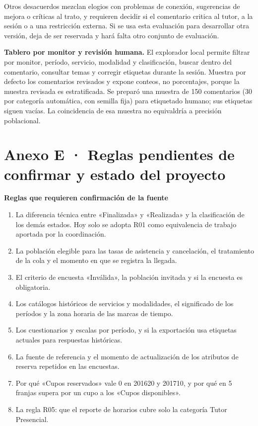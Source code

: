 \documentclass[11pt,letterpaper]{article}
\begin{document}
Otros desacuerdos mezclan elogios con problemas de conexión, sugerencias de mejora o críticas al trato, y requieren decidir si el comentario critica al tutor, a la sesión o a una restricción externa. Si se usa esta evaluación para desarrollar otra versión, deja de ser reservada y hará falta otro conjunto de evaluación.

\textbf{Tablero por monitor y revisión humana.} El explorador local permite filtrar por monitor, período, servicio, modalidad y clasificación, buscar dentro del comentario, consultar temas y corregir etiquetas durante la sesión. Muestra por defecto los comentarios revisados y expone conteos, no porcentajes, porque la muestra revisada es estratificada. Se preparó una muestra de 150 comentarios (30 por categoría automática, con semilla fija) para etiquetado humano; sus etiquetas siguen vacías. La coincidencia de esa muestra no equivaldría a precisión poblacional.

\section*{Anexo E · Reglas pendientes de confirmar y estado del proyecto}

\textbf{Reglas que requieren confirmación de la fuente}

\begin{enumerate}[leftmargin=1.5em,itemsep=2pt]
\item La diferencia técnica entre «Finalizada» y «Realizada» y la clasificación de los demás estados. Hoy solo se adopta R01 como equivalencia de trabajo aportada por la coordinación.
\item La población elegible para las tasas de asistencia y cancelación, el tratamiento de la cola y el momento en que se registra la llegada.
\item El criterio de encuesta «Inválida», la población invitada y si la encuesta es obligatoria.
\item Los catálogos históricos de servicios y modalidades, el significado de los períodos y la zona horaria de las marcas de tiempo.
\item Los cuestionarios y escalas por período, y si la exportación usa etiquetas actuales para respuestas históricas.
\item La fuente de referencia y el momento de actualización de los atributos de reserva repetidos en las encuestas.
\item Por qué «Cupos reservados» vale 0 en 201620 y 201710, y por qué en 5 franjas supera por un cupo a los «Cupos disponibles».
\item La regla R05: que el reporte de horarios cubre solo la categoría Tutor Presencial.
\end{enumerate}
\end{document}
